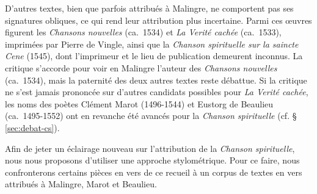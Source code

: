 \documentclass[final, fra]{anthology-ch}
\begin{document}
D'autres textes, bien que parfois attribués à Malingre, ne comportent pas ses signatures obliques, ce qui rend leur attribution plus incertaine. Parmi ces œuvres figurent les \textit{Chansons nouvelles} (ca.~1534) et \textit{La Verité cachée} (ca.~1533), imprimées par Pierre de Vingle, ainsi que la \textit{Chanson spirituelle sur la saincte Cene} (1545), dont l'imprimeur et le lieu de publication demeurent inconnus. La critique s'accorde pour voir en Malingre l'auteur des \textit{Chansons nouvelles} (ca.~1534), mais la paternité des deux autres textes reste débattue.
Si la critique ne s'est jamais prononcée sur d'autres candidats possibles pour \textit{La Verité cachée}, les noms des poètes Clément Marot (1496-1544) \cite{berthon2014intention, berthon2019marot_bibliographie} et Eustorg de Beaulieu (ca.~1495-1552) \cite{goeury2018chrestienne,harvitt_eustorg_1918} ont en revanche été avancés pour la \textit{Chanson spirituelle} (cf. § \ref{sec:debat-cs}).

Afin de jeter un éclairage nouveau sur l'attribution de la \textit{Chanson spirituelle}, nous nous proposons d'utiliser une approche stylométrique.
Pour ce faire, nous confronterons certains pièces en vers de ce recueil à un corpus de textes en vers attribués à Malingre, Marot et Beaulieu.
\end{document}
